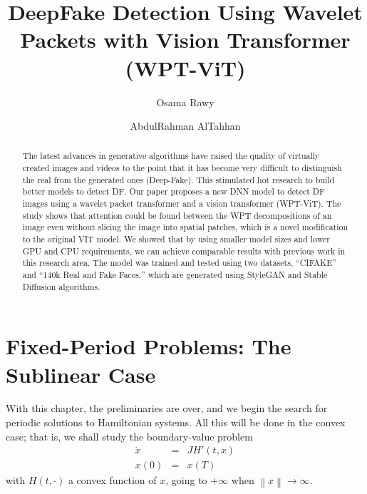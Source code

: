 \documentclass{svproc}
\begin{document}
\mainmatter              %
%
\title{DeepFake Detection Using Wavelet Packets with Vision Transformer (WPT-ViT)}
%
%
\author{Osama Rawy \and AbdulRahman AlTahhan}
%
%
%

\maketitle              %

\begin{abstract}
The latest advances in generative algorithms have raised the quality of virtually created images and videos to the point that it has become very difficult to distinguish the real from the generated ones (Deep-Fake). This stimulated hot research to build better models to detect DF.  Our paper proposes a new DNN model to detect DF images using a wavelet packet transformer and a vision transformer (WPT-ViT). The study shows that attention could be found between the WPT decompositions of an image even without slicing the image into spatial patches, which is a novel modification to the original VIT model. We showed that by using smaller model sizes and lower GPU and CPU requirements, we can achieve comparable results with previous work in this research area, The model was trained and tested using two datasets, “CIFAKE” and “140k Real and Fake Faces,” which are generated using StyleGAN and Stable Diffusion algorithms.
\end{abstract}
%
\section{Fixed-Period Problems: The Sublinear Case}
%
With this chapter, the preliminaries are over, and we begin the search
for periodic solutions to Hamiltonian systems. All this will be done in
the convex case; that is, we shall study the boundary-value problem
\begin{eqnarray*}
  \dot{x}&=&JH' (t,x)\\
  x(0) &=& x(T)
\end{eqnarray*}
with $H(t,\cdot)$ a convex function of $x$, going to $+\infty$ when
$\left\|x\right\| \to \infty$.
\end{document}

